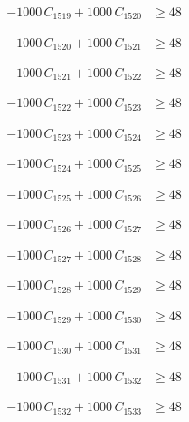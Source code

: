 \documentclass[a4paper,11pt]{article}
\begin{document}
\begin{align}
-1000\,C_{1519} + 1000\,C_{1520} &\geq 48 \nonumber
\end{align}

\begin{align}
-1000\,C_{1520} + 1000\,C_{1521} &\geq 48 \nonumber
\end{align}

\begin{align}
-1000\,C_{1521} + 1000\,C_{1522} &\geq 48 \nonumber
\end{align}

\begin{align}
-1000\,C_{1522} + 1000\,C_{1523} &\geq 48 \nonumber
\end{align}

\begin{align}
-1000\,C_{1523} + 1000\,C_{1524} &\geq 48 \nonumber
\end{align}

\begin{align}
-1000\,C_{1524} + 1000\,C_{1525} &\geq 48 \nonumber
\end{align}

\begin{align}
-1000\,C_{1525} + 1000\,C_{1526} &\geq 48 \nonumber
\end{align}

\begin{align}
-1000\,C_{1526} + 1000\,C_{1527} &\geq 48 \nonumber
\end{align}

\begin{align}
-1000\,C_{1527} + 1000\,C_{1528} &\geq 48 \nonumber
\end{align}

\begin{align}
-1000\,C_{1528} + 1000\,C_{1529} &\geq 48 \nonumber
\end{align}

\begin{align}
-1000\,C_{1529} + 1000\,C_{1530} &\geq 48 \nonumber
\end{align}

\begin{align}
-1000\,C_{1530} + 1000\,C_{1531} &\geq 48 \nonumber
\end{align}

\begin{align}
-1000\,C_{1531} + 1000\,C_{1532} &\geq 48 \nonumber
\end{align}

\begin{align}
-1000\,C_{1532} + 1000\,C_{1533} &\geq 48 \nonumber
\end{align}
\end{document}
